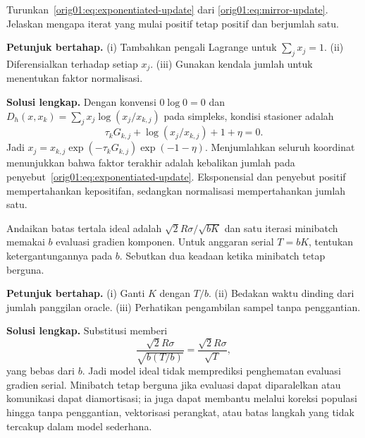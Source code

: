 \begin{exercise}
  \label{orig01:exercise:entropy-update}
  Turunkan~\eqref{orig01:eq:exponentiated-update} dari
  \eqref{orig01:eq:mirror-update}. Jelaskan mengapa iterat yang mulai positif
  tetap positif dan berjumlah satu.

  \textbf{Petunjuk bertahap.}
  (i) Tambahkan pengali Lagrange untuk $\sum_jx_j=1$.
  (ii) Diferensialkan terhadap setiap $x_j$.
  (iii) Gunakan kendala jumlah untuk menentukan faktor normalisasi.

  \textbf{Solusi lengkap.}
  Dengan konvensi $0\log0=0$ dan
  $D_h(x,x_k)=\sum_jx_j\log(x_j/x_{k,j})$ pada simpleks, kondisi
  stasioner adalah
  \begin{equation}
    \tau_kG_{k,j}+\log(x_j/x_{k,j})+1+\eta=0.
  \end{equation}
  Jadi $x_j=x_{k,j}\exp(-\tau_kG_{k,j})\exp(-1-\eta)$. Menjumlahkan seluruh
  koordinat menunjukkan bahwa faktor terakhir adalah kebalikan jumlah pada
  penyebut~\eqref{orig01:eq:exponentiated-update}. Eksponensial dan penyebut
  positif mempertahankan kepositifan, sedangkan normalisasi mempertahankan
  jumlah satu.
\end{exercise}

\begin{exercise}
  \label{orig01:exercise:oracle-budget}
  Andaikan batas tertala ideal adalah
  $\sqrt2R\sigma/\sqrt{bK}$ dan satu iterasi minibatch memakai $b$ evaluasi
  gradien komponen. Untuk anggaran serial $T=bK$, tentukan ketergantungannya
  pada $b$. Sebutkan dua keadaan ketika minibatch tetap berguna.

  \textbf{Petunjuk bertahap.}
  (i) Ganti $K$ dengan $T/b$.
  (ii) Bedakan waktu dinding dari jumlah panggilan oracle.
  (iii) Perhatikan pengambilan sampel tanpa penggantian.

  \textbf{Solusi lengkap.}
  Substitusi memberi
  \begin{equation}
    \frac{\sqrt2R\sigma}{\sqrt{b(T/b)}}
    =\frac{\sqrt2R\sigma}{\sqrt T},
  \end{equation}
  yang bebas dari $b$. Jadi model ideal tidak memprediksi penghematan
  evaluasi gradien serial. Minibatch tetap berguna jika evaluasi dapat
  diparalelkan atau komunikasi dapat diamortisasi; ia juga dapat membantu
  melalui koreksi populasi hingga tanpa penggantian, vektorisasi perangkat,
  atau batas langkah yang tidak tercakup dalam model sederhana.
\end{exercise}

